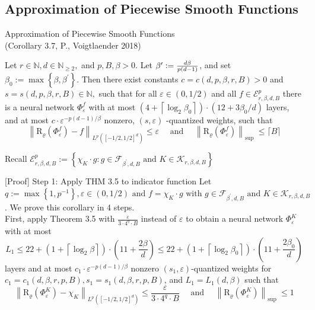 \documentclass{if-beamer}
\newcommand{\defeq}{\vcentcolon=}
\begin{document}
\subsection{Approximation of Piecewise Smooth Functions}
\begin{frame}{Approximation of Piecewise Smooth Functions \\ (Corollary 3.7, P., Voigtlaender 2018)}
    \begin{tcolorbox}
        Let $r \in \mathbb{N}, d \in \mathbb{N}_{\geq 2},$ and $p, B, \beta>0 .$ Let $\beta^{\prime}\defeq \frac{d\beta}{p(d-1)}$, and set $\beta_{0}:=\max \left\{\beta, \beta^{\prime}\right\} .$ Then
        there exist constants $c=c(d, p, \beta, r, B)>0$ and $s=s(d, p, \beta, r, B) \in \mathbb{N},$ such that for all $\varepsilon \in(0,1 / 2)$ and all $f \in \mathcal{E}_{r, \beta, d, B}^{p}$ there is a neural network $\Phi_{\varepsilon}^{f}$ with at most $\left(4+\left\lceil\log _{2} \beta_{0}\right\rceil\right) \cdot\left(12+3 \beta_{0} / d\right)$ layers, and at most
        $c \cdot \varepsilon^{-p(d-1) / \beta}$ nonzero, $(s, \varepsilon)$ -quantized weights, such that
        {\small
        \[
        \left\|\mathrm{R}_{\varrho}\left(\Phi_{\varepsilon}^{f}\right)-f\right\|_{L^{p}\left([-1 / 2,1 / 2]^{d}\right)} \leq \varepsilon \quad \text { and } \quad\left\|\mathrm{R}_{\varrho}\left(\Phi_{\varepsilon}^{f}\right)\right\|_{\text {sup }} \leq\lceil B\rceil
        \]
        }%
    \end{tcolorbox}
    Recall $\mathcal{E}_{r, \beta, d, B}^{p}:=\left\{\chi_{K} \cdot g: g \in \mathcal{F}_{\beta^{\prime}, d, B} \text { and } K \in \mathcal{K}_{r, \beta, d, B}\right\}$
\end{frame}

\begin{frame}{[Proof] Step 1: Apply THM 3.5 to indicator function}
    Let $q:=\max \left\{1, p^{-1}\right\}, \varepsilon \in(0,1 / 2) \text { and } f=\chi_{K} \cdot g \text { with } g \in \mathcal{F}_{\beta^{\prime}, d, B} \text { and } K \in \mathcal{K}_{r, \beta, d, B}$. We prove this corollary in 4 steps.\\
    First, apply Theorem 3.5 with $\frac{\varepsilon}{3\cdot 4^q \cdot B}$ instead of $\varepsilon$ to obtain a neural network $\Phi_{\varepsilon}^K$ with at most $$L_1 \leq 22 + \left(1+\left\lceil\log _{2} \beta\right\rceil\right) \cdot(11+\frac{2\beta}{d}) \leq 22 + \left(1+\left\lceil\log _{2} \beta_0\right\rceil\right) \cdot(11+\frac{2\beta_0}{d})$$ layers and at most $c_1\cdot \varepsilon^{-p(d-1)/\beta}$ nonzero $(s_1,\varepsilon)$-quantized weights for $c_1=c_1(d,\beta,r,p,B), s_1=s_1(d,\beta,r,p,B)$, and $L_1=L_1(d,\beta)$ such that
    {\small
    $$\left\|\mathrm{R}_{\varrho}\left(\Phi_{\varepsilon}^{K}\right)-\chi_{K}\right\|_{L^{p}\left([-1 / 2,1 / 2]^{d}\right)} \leq \frac{\varepsilon}{3 \cdot 4^{q} \cdot B} \quad \text { and } \quad\left\|\mathrm{R}_{\varrho}\left(\Phi_{\varepsilon}^{K}\right)\right\|_{\text {sup }} \leq 1 $$
    }%
\end{frame}
\end{document}
